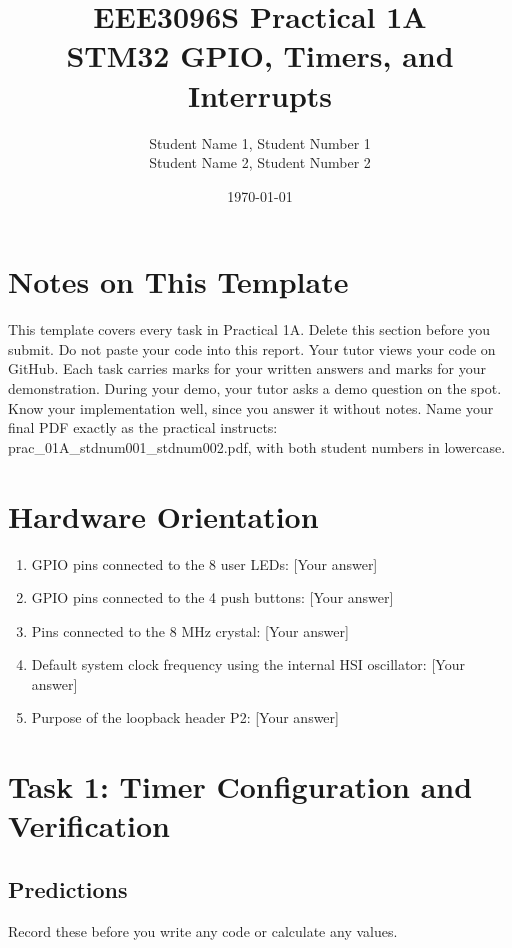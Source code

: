 \documentclass[11pt]{article}
\title{\textbf{EEE3096S Practical 1A} \\ STM32 GPIO, Timers, and Interrupts}
\author{Student Name 1, Student Number 1 \\ Student Name 2, Student Number 2}
\date{\today}
\begin{document}
\maketitle

\section*{Notes on This Template}
This template covers every task in Practical 1A. Delete this section before you submit.
\newline
\newline
Do not paste your code into this report. Your tutor views your code on GitHub. Each task carries marks for your written answers and marks for your demonstration. During your demo, your tutor asks a demo question on the spot. Know your implementation well, since you answer it without notes.
\newline
\newline
Name your final PDF exactly as the practical instructs: prac\_01A\_stdnum001\_stdnum002.pdf, with both student numbers in lowercase.

\section{Hardware Orientation}

\begin{enumerate}
    \item GPIO pins connected to the 8 user LEDs: [Your answer]
    \item GPIO pins connected to the 4 push buttons: [Your answer]
    \item Pins connected to the 8 MHz crystal: [Your answer]
    \item Default system clock frequency using the internal HSI oscillator: [Your answer]
    \item Purpose of the loopback header P2: [Your answer]
\end{enumerate}

\section{Task 1: Timer Configuration and Verification}

\subsection{Predictions}
Record these before you write any code or calculate any values.
\end{document}
